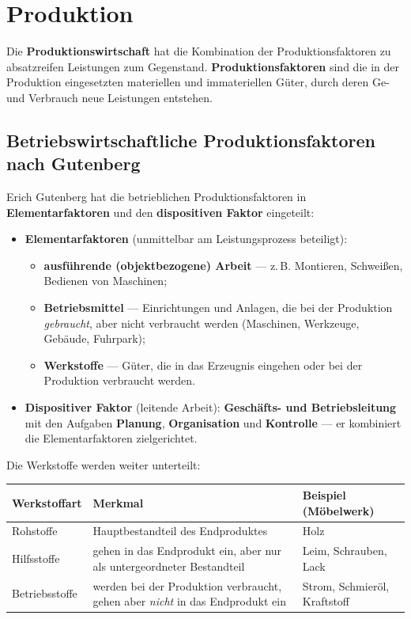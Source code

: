\documentclass[11pt, a4paper]{article}
\begin{document}
\section{Produktion}

Die \textbf{Produktionswirtschaft} hat die Kombination der Produktionsfaktoren zu
absatzreifen Leistungen zum Gegenstand. \textbf{Produktionsfaktoren} sind die in der
Produktion eingesetzten materiellen und immateriellen Güter, durch deren Ge- und
Verbrauch neue Leistungen entstehen.

\subsection{Betriebswirtschaftliche Produktionsfaktoren nach Gutenberg}

Erich Gutenberg hat die betrieblichen Produktionsfaktoren in \textbf{Elementarfaktoren}
und den \textbf{dispositiven Faktor} eingeteilt:

\begin{itemize}
  \item \textbf{Elementarfaktoren} (unmittelbar am Leistungsprozess beteiligt):
    \begin{itemize}
      \item \textbf{ausführende (objektbezogene) Arbeit} --- z.\,B. Montieren, Schweißen,
        Bedienen von Maschinen;
      \item \textbf{Betriebsmittel} --- Einrichtungen und Anlagen, die bei der Produktion
        \emph{gebraucht}, aber nicht verbraucht werden (Maschinen, Werkzeuge, Gebäude,
        Fuhrpark);
      \item \textbf{Werkstoffe} --- Güter, die in das Erzeugnis eingehen oder bei der
        Produktion verbraucht werden.
    \end{itemize}
  \item \textbf{Dispositiver Faktor} (leitende Arbeit): \textbf{Geschäfts- und
    Betriebsleitung} mit den Aufgaben \textbf{Planung}, \textbf{Organisation} und
    \textbf{Kontrolle} --- er kombiniert die Elementarfaktoren zielgerichtet.
\end{itemize}

Die Werkstoffe werden weiter unterteilt:

\begin{center}
\begin{tabular}{p{3.2cm} p{6.4cm} p{4.6cm}}
\textbf{Werkstoffart} & \textbf{Merkmal} & \textbf{Beispiel (Möbelwerk)}\\
\hline
Rohstoffe & Hauptbestandteil des Endproduktes & Holz\\
Hilfsstoffe & gehen in das Endprodukt ein, aber nur als untergeordneter Bestandteil & Leim, Schrauben, Lack\\
Betriebsstoffe & werden bei der Produktion verbraucht, gehen aber \emph{nicht} in das Endprodukt ein & Strom, Schmieröl, Kraftstoff\\
\end{tabular}
\end{center}
\end{document}
